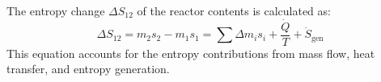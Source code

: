 The entropy change \( \Delta S_{12} \) of the reactor contents is calculated as:  
\[
\Delta S_{12} = m_2 s_2 - m_1 s_1 = \sum \Delta m_i s_i + \frac{\dot{Q}}{T} + \dot{S}_{\text{gen}}
\]  
This equation accounts for the entropy contributions from mass flow, heat transfer, and entropy generation.